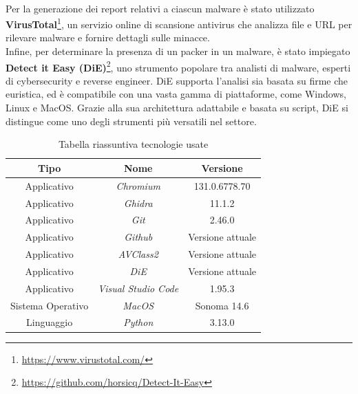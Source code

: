 \\  
Per la generazione dei report relativi a ciascun malware è stato utilizzato \textbf{VirusTotal}\footnote{\url{https://www.virustotal.com/}}, un servizio online di scansione antivirus che analizza file e URL per rilevare malware e fornire dettagli sulle minacce.  
\\  
Infine, per determinare la presenza di un packer in un malware, è stato impiegato \textbf{Detect it Easy (DiE)}\footnote{\url{https://github.com/horsicq/Detect-It-Easy}}, uno strumento popolare tra analisti di malware, esperti di cybersecurity e reverse engineer. DiE supporta l'analisi sia basata su firme che euristica, ed è compatibile con una vasta gamma di piattaforme, come Windows, Linux e MacOS. Grazie alla sua architettura adattabile e basata su script, DiE si distingue come uno degli strumenti più versatili nel settore.

\hfill
\begin{table}[!h]
    \centering
    \begin{tabular}{|c|c|c|}
        \hline
        \textbf{Tipo} & \textbf{Nome} & \textbf{Versione} \\
        \hline
        Applicativo & \emph{Chromium} & 131.0.6778.70 \\
        \hline
        Applicativo & \emph{Ghidra} & 11.1.2 \\
        \hline
        Applicativo & \emph{Git} & 2.46.0 \\
        \hline
        Applicativo & \emph{Github} & Versione attuale \\
        \hline
        Applicativo & \emph{AVClass2} & Versione attuale \\
        \hline
        Applicativo & \emph{DiE} & Versione attuale \\
        \hline
        Applicativo & \emph{Visual Studio Code} & 1.95.3 \\
        \hline
        Sistema Operativo & \emph{MacOS} & Sonoma 14.6 \\
        \hline
        Linguaggio & \emph{Python} & 3.13.0 \\
        \hline
    \end{tabular}
    \vspace*{.2cm}
    \caption{Tabella riassuntiva tecnologie usate}
    \label{table-tecnologie}
\end{table}

